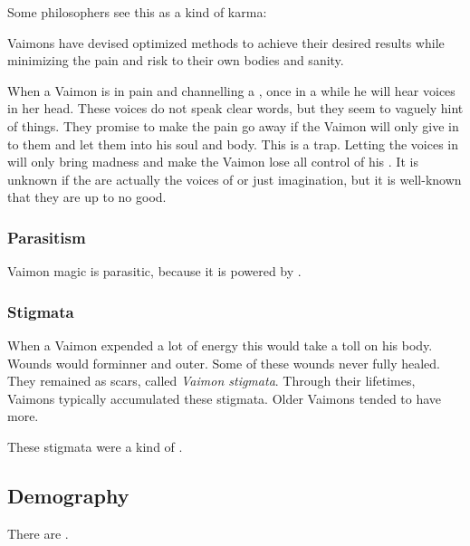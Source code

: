 Some philosophers see this as a kind of karma: 

\Itzach{} Vaimons have devised optimized methods to achieve their desired results while minimizing the pain and risk to their own bodies and sanity. 

When a Vaimon is in pain and channelling a \qliphah, once in a while he will hear voices in her head. 
These voices do not speak clear words, but they seem to vaguely hint of things. 
They promise to make the pain go away if the Vaimon will only give in to them and let them into his soul and body. 
This is a trap. 
Letting the voices in will only bring madness and make the Vaimon lose all control of his \qliphoth. 
It is unknown if the  are actually the voices of \qliphoth{} or just imagination, but it is well-known that they are up to no good. 





\subsubsection{Parasitism}
Vaimon magic is parasitic, because it is powered by . 





\subsubsection{Stigmata}
When a Vaimon expended a lot of energy this would take a toll on his body. 
Wounds would form\dash inner and outer. 
Some of these wounds never fully healed.
They remained as scars, called \emph{Vaimon stigmata}. 
Through their lifetimes, Vaimons typically accumulated these stigmata. 
Older Vaimons tended to have more. 

These stigmata were a kind of .








\subsection{Demography}
There are . 









